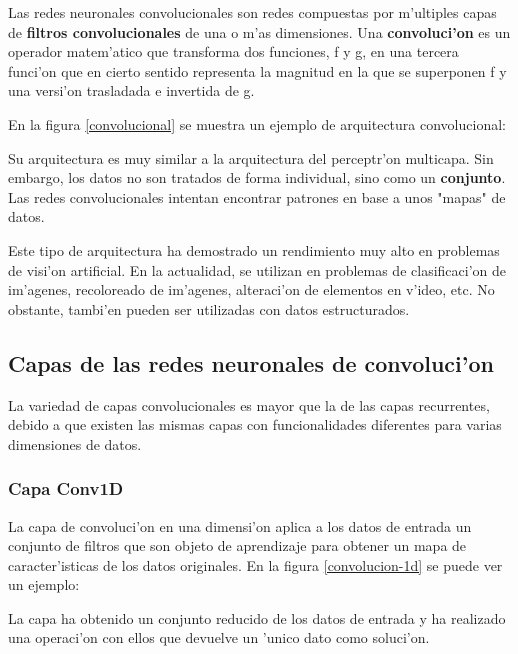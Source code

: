 Las redes neuronales convolucionales son redes compuestas por m'ultiples capas de \textbf{filtros convolucionales} de una o m'as dimensiones. 
Una \textbf{convoluci'on} es un operador matem'atico que transforma dos funciones, f y g, en una tercera funci'on que en cierto sentido representa la magnitud en la que se superponen f y una versi'on trasladada e invertida de g. \cite{deep4}

En la figura \ref{convolucional} se muestra un ejemplo de arquitectura convolucional:

Su arquitectura es muy similar a la arquitectura del perceptr'on multicapa. 
Sin embargo, los datos no son tratados de forma individual, sino como un \textbf{conjunto}. Las redes convolucionales intentan encontrar patrones en base a unos "mapas" de datos.

Este tipo de arquitectura ha demostrado un rendimiento muy alto en problemas de visi'on artificial. En la actualidad, se utilizan en problemas de clasificaci'on de im'agenes, recoloreado de im'agenes, alteraci'on de elementos en v'ideo, etc. No obstante, tambi'en pueden ser utilizadas con datos estructurados.



\clearpage



\subsection{Capas de las redes neuronales de convoluci'on}

La variedad de capas convolucionales es mayor que la de las capas recurrentes, debido a que existen las mismas capas con funcionalidades diferentes para varias dimensiones de datos.

\subsubsection{Capa Conv1D}

La capa de convoluci'on en una dimensi'on aplica a los datos de entrada un conjunto de filtros que son objeto de aprendizaje para obtener un mapa de caracter'isticas de los datos originales.
En la figura \ref{convolucion-1d} se puede ver un ejemplo:  


La capa ha obtenido un conjunto reducido de los datos de entrada y ha realizado una operaci'on con ellos que devuelve un 'unico dato como soluci'on.

